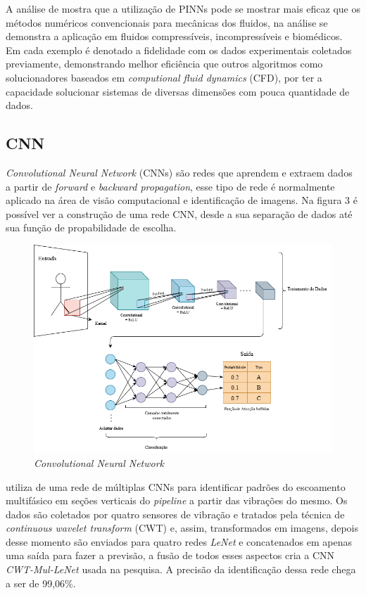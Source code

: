 \documentclass{article}[12pt, openright, oneside, a4paper, portuguese]
\begin{document}
    A análise de  mostra que a utilização de PINNs pode se mostrar mais eficaz que os métodos numéricos convencionais para mecânicas dos fluidos, na análise se demonstra a aplicação em fluidos compressíveis, incompressíveis e biomédicos. Em cada exemplo é denotado a fidelidade com os dados experimentais coletados previamente, demonstrando melhor eficiência que outros algoritmos como solucionadores baseados em \textit{computional fluid dynamics} (CFD), por ter a capacidade solucionar sistemas de diversas dimensões com pouca quantidade de dados.

    \subsection{CNN}

    \textit{Convolutional Neural Network} (CNNs) são redes que aprendem e extraem dados a partir de \textit{forward} e \textit{backward propagation}, esse tipo de rede é normalmente aplicado na área de visão computacional e identificação de imagens. Na figura 3 é possível ver a construção de uma rede CNN, desde a sua separação de dados até sua função de propabilidade de escolha.

    \begin{figure}[H]
        \centering
        \includegraphics[width=0.75\linewidth]{src/Imagens/CNN Diagrama.drawio.png}
        \caption{\textit{Convolutional Neural Network}}
    \end{figure}
    
     utiliza de uma rede de múltiplas CNNs para identificar padrões do escoamento multifásico em seções verticais do \textit{pipeline} a partir das vibrações do mesmo. Os dados são coletados por quatro sensores de vibração e tratados pela técnica de \textit{continuous wavelet transform} (CWT) e, assim, transformados em imagens, depois desse momento são enviados para quatro redes \textit{LeNet} e concatenados em apenas uma saída para fazer a previsão, a fusão de todos esses aspectos cria a CNN \textit{CWT-Mul-LeNet} usada na pesquisa. A precisão da identificação dessa rede chega a ser de 99,06\%.
\end{document}
